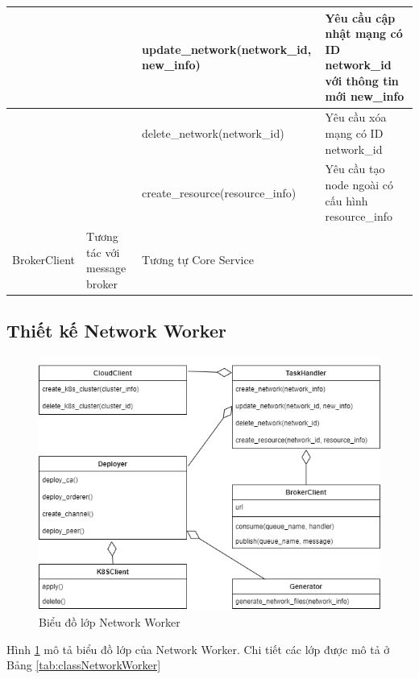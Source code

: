 \documentclass[../DoAn.tex]{subfiles}
\begin{document}
\begin{longtable}{|p{}|p{}|p{}|p{}|}
                                                               &                                                                           & update\_network\hspace{0pt}(network\_id, new\_info)       & Yêu cầu cập nhật mạng có ID network\_id với thông tin mới new\_info       \\ \hline
                                                               &                                                                           & delete\_network\hspace{0pt}(network\_id)                  & Yêu cầu xóa mạng có ID network\_id                                        \\ \cline{3-4}
                                                               &                                                                           & create\_resource\hspace{0pt}(resource\_info)              & Yêu cầu tạo node ngoài có cấu hình resource\_info                         \\ \hline
    BrokerClient                                               & Tương tác với message broker                                              & \multicolumn{2}{p{0.525\textwidth}|}{Tương tự Core Service}                                                                             \\ \hline
\end{longtable}

\subsection{Thiết kế Network Worker}

\begin{figure}[H]
    \centering
    \includegraphics[width=0.5\linewidth]{Hinhve/DoAn-ClassNetworkWorker.drawio.png}
    \caption{Biểu đồ lớp Network Worker}
    \label{fig:classNetworkWorker}
\end{figure}

Hình \ref{fig:classNetworkWorker} mô tả biểu đồ lớp của Network Worker. Chi
tiết các lớp được mô tả ở Bảng \ref{tab:classNetworkWorker}
\end{document}
